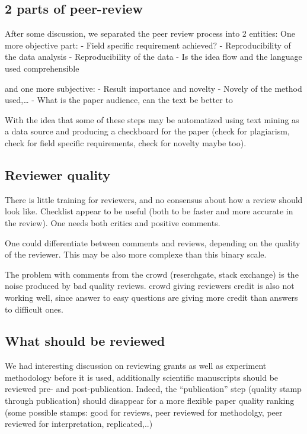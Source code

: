 \documentclass[]{article}
\begin{document}
\subsection{2 parts of peer-review}\label{parts-of-peer-review}

After some discussion, we separated the peer review process into 2
entities: One more objective part: - Field specific requirement
achieved? - Reproducibility of the data analysis - Reproducibility of
the data - Is the idea flow and the language used comprehensible

and one more subjective: - Result importance and novelty - Novely of the
method used,\ldots{} - What is the paper audience, can the text be
better to

With the idea that some of these steps may be automatized using text
mining as a data source and producing a checkboard for the paper (check
for plagiarism, check for field specific requirements, check for novelty
maybe too).

\subsection{Reviewer quality}\label{reviewer-quality}

There is little training for reviewers, and no consensus about how a
review should look like. Checklist appear to be useful (both to be
faster and more accurate in the review). One needs both critics and
positive comments.

One could differentiate between comments and reviews, depending on the
quality of the reviewer. This may be also more complexe than this binary
scale.

The problem with comments from the crowd (reserchgate, stack exchange)
is the noise produced by bad quality reviews. crowd giving reviewers
credit is also not working well, since answer to easy questions are
giving more credit than answers to difficult ones.

\subsection{What should be reviewed}\label{what-should-be-reviewed}

We had interesting discussion on reviewing grants as well as experiment
methodology before it is used, additionally scientific manuscripts
should be reviewed pre- and post-publication. Indeed, the
``publication'' step (quality stamp through publication) should
disappear for a more flexible paper quality ranking (some possible
stamps: good for reviews, peer reviewed for methodolgy, peer reviewed
for interpretation, replicated,..)
\end{document}

